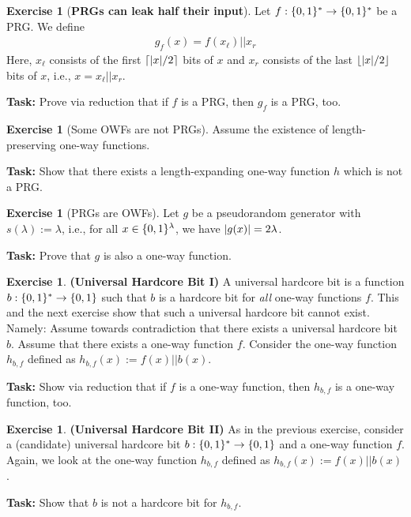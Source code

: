 \documentclass[envcountsame,runningheads,notitlepage]{../llncs}
\theoremstyle{definition}
\newtheorem{graded}[crossed]{Exercise}
\begin{document}

\begin{graded}[\textbf{PRGs can leak half their input}]
Let $f:\{0,1\}^*\rightarrow\{0,1\}^*$ be a PRG. We define
\begin{align*}
g_f(x)= f(x_\ell)||x_r
\end{align*}
Here, $x_\ell$ consists of the first $\ceil{\abs{x}/2}$ bits of $x$ and $x_r$ consists of the last $\floor{\abs{x}/2}$ bits of $x$, i.e., $x=x_\ell||x_r$.

\medskip
\noindent
\textbf{Task:} Prove via reduction that if $f$ is a PRG, then $g_f$ is a PRG, too.
\end{graded}

\begin{graded}[Some OWFs are not PRGs]
Assume the existence of length-preserving one-way functions. 

\medskip
\noindent
\textbf{Task:} Show that there exists a length-expanding one-way function $h$ which is not a PRG.
\end{graded}

\begin{graded}[PRGs are OWFs]
	Let $g$ be a pseudorandom generator with $s(\lambda):=\lambda$, i.e., for all $x\in\{0,1\}^\lambda$, we have $\left\lvert g(x)\right\rvert=2\lambda$.
	
\medskip
\noindent
\textbf{Task:} Prove that $g$ is also a one-way function.
\end{graded}

\begin{graded}\textbf{(Universal Hardcore Bit I)}
A universal hardcore bit is a function $b:\{0,1\}^*\rightarrow\{0,1\}$ such that $b$ is a hardcore bit for \emph{all} one-way functions $f$. This and the next exercise show that such a universal hardcore bit cannot exist. Namely: Assume towards contradiction that there exists a universal hardcore bit $b$. Assume that there exists a one-way function $f$. Consider the one-way function $h_{b,f}$ defined as $h_{b,f}(x):=f(x)||b(x)$.

\medskip
\noindent
\textbf{Task:} Show via reduction that if $f$ is a one-way function, then $h_{b,f}$ is a one-way function, too.
\end{graded}


\begin{graded}\textbf{(Universal Hardcore Bit II)}
As in the previous exercise, consider a (candidate) universal hardcore bit $b:\{0,1\}^*\rightarrow\{0,1\}$ and a one-way function $f$. Again, we look at the one-way function $h_{b,f}$ defined as $h_{b,f}(x):=f(x)||b(x)$.

\medskip
\noindent
\textbf{Task:} Show that $b$ is not a hardcore bit for $h_{b,f}$.
\end{graded}
\end{document}
